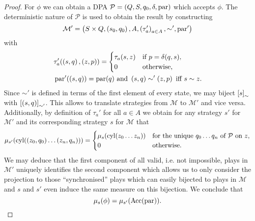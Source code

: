 \begin{proof}
  For $\phi$ we can obtain a \ac{DPA} 
  $\mathcal{P} = \left(Q, S, q_{0}, \delta, \operatorname{par}\right)$ which accepts $\phi$.
  The deterministic nature of $\mathcal{P}$ is used to obtain the result by
  constructing
  \begin{equation*}
    \mathcal{M'} = \left(S\times Q, \left(s_{0}, q_{0}\right), A, 
    \left(\tau'_{a}\right)_{a\in A}, \sim', \operatorname{par}'\right)
  \end{equation*}
  with
  \begin{align*}
    &\tau'_{a}(\left(s, q\right), \left(z, p\right)) = \begin{cases}
      \tau_{a}(s, z)&\text{if }p = \delta(q,s),\\
      0&\text{otherwise,}
    \end{cases}\\
    &\operatorname{par}'(\left(s,q\right)) = \operatorname{par}(q)
    \text{ and }
    \left(s, q\right)\sim'\left(z, p\right)\text{ iff }s\sim z.
  \end{align*}
  Since $\sim'$ is defined in terms of the first element of every state, we may
  biject $\left[s\right]_{\sim}$ with $\left[\left(s, q\right)\right]_{\sim'}$. This 
  allows to translate strategies from $\mathcal{M}$ to $\mathcal{M'}$ and vice
  versa. Additionally, by definition of $\tau_{a}'$ for all $a\in A$ we 
  obtain for any strategy $s'$ for $\mathcal{M'}$ and its corresponding 
  strategy $s$ for $\mathcal{M}$ that
  \begin{equation*}
    \mu_{s'}(\operatorname{cyl}(\left(z_{0}, q_{0}\right)\dots\left(z_{n}, q_{n}\right))) = 
    \begin{cases}
      \mu_{s}(\operatorname{cyl}(z_{0}\dots z_{n}))&\text{for the unique }
        q_{0}\dots q_{n}\text{ of }\mathcal{P}\text{ on }z,\\
      0&\text{otherwise.}
    \end{cases}
  \end{equation*}
  We may deduce that the first component of all valid, i.e. not impossible, 
  plays in $\mathcal{M}'$ uniquely identifies the second component which allows 
  us to only consider the projection to those \enquote{synchronised} plays 
  which can easily bijected to plays in $\mathcal{M}$ and $s$ and $s'$ even 
  induce the same measure on this bijection. We conclude that
  \begin{equation*}
    \mu_{s}(\phi) = \mu_{s'}(\operatorname{Acc}(\operatorname{par})).
  \end{equation*}
\end{proof}

